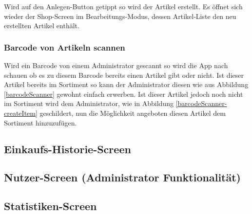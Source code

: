 Wird auf den Anlegen-Button getippt so wird der Artikel erstellt. Es öffnet sich wieder der Shop-Screen im Bearbeitungs-Modus, dessen Artikel-Liste den neu erstellten Artikel enthält.


\subsubsection{Barcode von Artikeln scannen} \label{subsubsec:shop-admin-scan-item}

Wird ein Barcode von einem Administrator gescannt so wird die App nach schauen ob es zu diesem Barcode bereits einen Artikel gibt oder nicht. Ist dieser Artikel bereits im Sortiment so kann der Administrator diesen wie aus Abbildung \ref{barcodeScanner} gewohnt einfach erwerben. Ist dieser Artikel jedoch noch nicht im Sortiment wird dem Administrator, wie in Abbildung \ref{barcodeScanner-createItem} geschildert, nun die Möglichkeit angeboten diesen Artikel dem Sortiment hinzuzufügen.


\subsection{Einkaufs-Historie-Screen} \label{subsec:purchases-screen}


\subsection{Nutzer-Screen (Administrator Funktionalität)} \label{subsec:user-screen}

\subsection{Statistiken-Screen} \label{subsec:statistics-screen}

